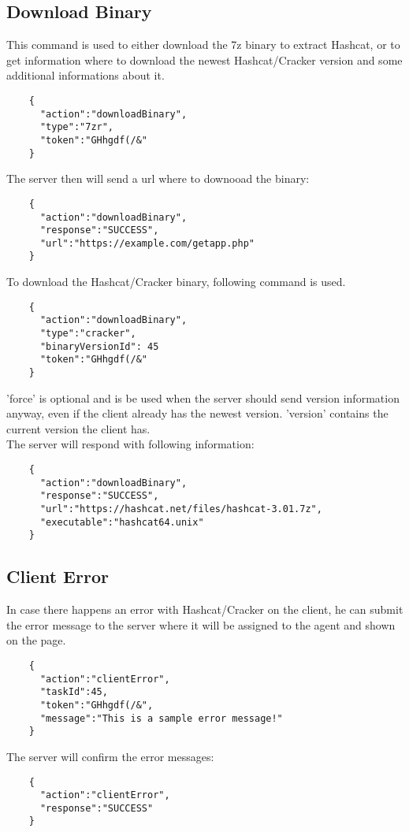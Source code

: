 \documentclass{article}
\begin{document}
	\subsection*{Download Binary}
	This command is used to either download the 7z binary to extract Hashcat, or to get information where to download the newest Hashcat/Cracker version and some additional informations about it.
	\begin{verbatim}
	{
	  "action":"downloadBinary",
	  "type":"7zr",
	  "token":"GHhgdf(/&"
	}
	\end{verbatim}
	The server then will send a url where to downooad the binary:
	\begin{verbatim}
	{
	  "action":"downloadBinary",
	  "response":"SUCCESS",
	  "url":"https://example.com/getapp.php"
	}
	\end{verbatim}
	To download the Hashcat/Cracker binary, following command is used.
	\begin{verbatim}
	{
	  "action":"downloadBinary",
	  "type":"cracker",
	  "binaryVersionId": 45
	  "token":"GHhgdf(/&"
	}
	\end{verbatim}
	'force' is optional and is be used when the server should send version information anyway, even if the client already has the newest version. 'version' contains the current version the client has.\\
	The server will respond with following information:
	\begin{verbatim}
	{
	  "action":"downloadBinary",
	  "response":"SUCCESS",
	  "url":"https://hashcat.net/files/hashcat-3.01.7z",
	  "executable":"hashcat64.unix"
	}
	\end{verbatim}
	
	\subsection*{Client Error}
	In case there happens an error with Hashcat/Cracker on the client, he can submit the error message to the server where it will be assigned to the agent and shown on the page.
	\begin{verbatim}
	{
	  "action":"clientError",
	  "taskId":45,
	  "token":"GHhgdf(/&",
	  "message":"This is a sample error message!"
	}
	\end{verbatim}
	The server will confirm the error messages:
	\begin{verbatim}
	{
	  "action":"clientError",
	  "response":"SUCCESS"
	}
	\end{verbatim}
	
\end{document}
